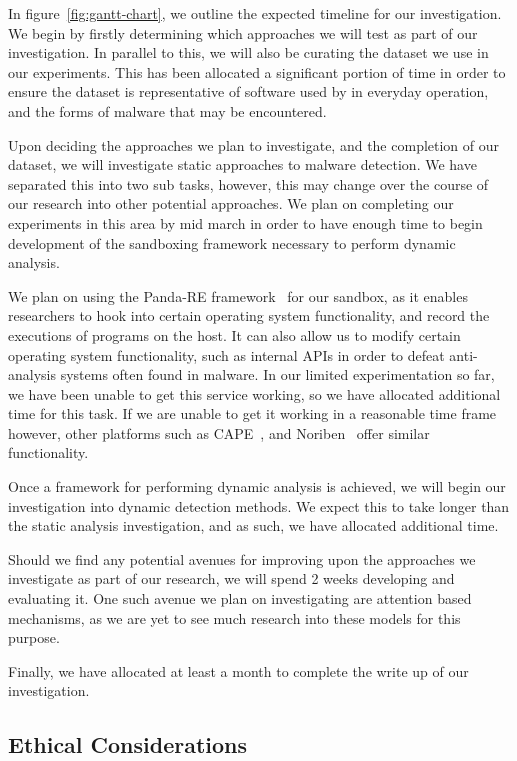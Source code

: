 \documentclass[twocolumn]{article}
\begin{document}
In figure~\ref{fig:gantt-chart}, we outline the expected timeline for our investigation. We begin by firstly determining which approaches we will test as part of our investigation. In parallel to this, we will also be curating the dataset we use in our experiments. This has been allocated a significant portion of time in order to ensure the dataset is representative of software used by in everyday operation, and the forms of malware that may be encountered. 

Upon deciding the approaches we plan to investigate, and the completion of our dataset, we will investigate static approaches to malware detection. We have separated this into two sub tasks, however, this may change over the course of our research into other potential approaches. We plan on completing our experiments in this area by mid march in order to have enough time to begin development of the sandboxing framework necessary to perform dynamic analysis. 

We plan on using the Panda-RE framework~\cite{gavitt2015panda} for our sandbox, as it enables researchers to hook into certain operating system functionality, and record the executions of programs on the host. It can also allow us to modify certain operating system functionality, such as internal APIs in order to defeat anti-analysis systems often found in malware. In our limited experimentation so far, we have been unable to get this service working, so we have allocated additional time for this task. If we are unable to get it working in a reasonable time frame however, other platforms such as CAPE~\cite{capesandbox}, and Noriben~\cite{baskin_ruriknoriben_2025} offer similar functionality. 

Once a framework for performing dynamic analysis is achieved, we will begin our investigation into dynamic detection methods. We expect this to take longer than the static analysis investigation, and as such, we have allocated additional time. 

Should we find any potential avenues for improving upon the approaches we investigate as part of our research, we will spend 2 weeks developing and evaluating it. One such avenue we plan on investigating are attention based mechanisms, as we are yet to see much research into these models for this purpose.

Finally, we have allocated at least a month to complete the write up of our investigation.

\subsection{Ethical Considerations}
\end{document}
